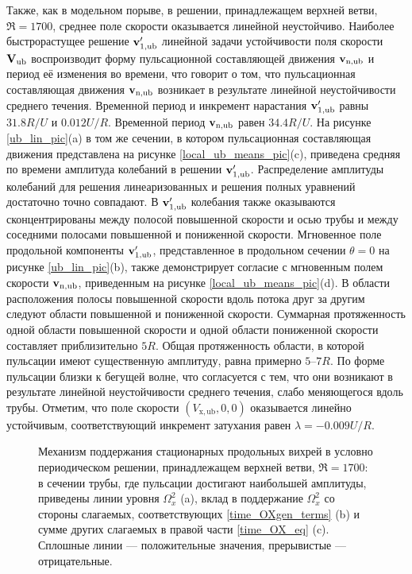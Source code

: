Также, как в модельном порыве, в решении, принадлежащем верхней ветви, $\Re = 1700$, среднее поле скорости оказывается линейной неустойчиво. Наиболее быстрорастущее решение $\mathbf{v}'_\mathrm{1,ub}$ линейной задачи устойчивости поля скорости $\mathbf{V}_\mathrm{ub}$ воспроизводит форму пульсационной составляющей движения $\mathbf{v}_\mathrm{n,ub}$ и период её изменения во времени, что говорит о том, что пульсационная составляющая движения $\mathbf{v}_\mathrm{n,ub}$ возникает в результате линейной неустойчивости среднего течения. Временной период и инкремент нарастания $\mathbf{v}'_\mathrm{1,ub}$ равны $31.8R/U$ и $0.012U/R$. Временной период $\mathbf{v}_\mathrm{n,ub}$ равен $34.4R/U$. На рисунке \ref{ub_lin_pic}(a) в том же сечении, в котором пульсационная составляющая движения представлена на рисунке \ref{local_ub_means_pic}(c), приведена средняя по времени амплитуда колебаний в решении $\mathbf{v}'_\mathrm{1,ub}$. Распределение амплитуды колебаний для решения линеаризованных и решения полных уравнений достаточно точно совпадают. В $\mathbf{v}'_\mathrm{1,ub}$ колебания также оказываются сконцентрированы между полосой повышенной скорости и осью трубы и между соседними полосами повышенной и пониженной скорости. Мгновенное поле продольной компоненты $\mathbf{v}'_\mathrm{1,ub}$, представленное в продольном сечении $\theta = 0$ на рисунке \ref{ub_lin_pic}(b), также демонстрирует согласие с мгновенным полем скорости $\mathbf{v}_\mathrm{n,ub}$, приведенным на рисунке \ref{local_ub_means_pic}(d). В области расположения полосы повышенной скорости вдоль потока друг за другим следуют области повышенной и пониженной скорости. Суммарная протяженность одной области повышенной скорости и одной области пониженной скорости составляет приблизительно $5R$. Общая протяженность области, в которой пульсации имеют существенную амплитуду, равна примерно $5$--$7R$. По форме пульсации близки к бегущей волне, что согласуется с тем, что они возникают в результате линейной неустойчивости среднего течения, слабо меняющегося вдоль трубы. Отметим, что поле скорости $(V_\mathrm{x,ub}, 0, 0)$ оказывается линейно устойчивым, соответствующий инкремент затухания равен $\lambda = -0.009U/R$. 


\begin{figure}
\caption{Механизм поддержания стационарных продольных вихрей в условно периодическом решении, принадлежащем верхней ветви, $\Re = 1700$: в сечении трубы, где пульсации достигают наибольшей амплитуды, приведены линии уровня $\Omega_x^2$ (a), вклад в поддержание $\Omega_x^2$ со стороны слагаемых, соответствующих \eqref{time_OXgen_terms} (b) и сумме других слагаемых в правой части \eqref{time_OX_eq} (c). Сплошные линии --- положительные значения, прерывистые --- отрицательные.}
\label{ub_OXgen_pic}
\end{figure}


